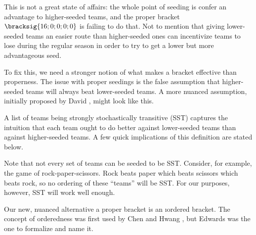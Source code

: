 {    This is not a great state of affairs: the whole point of seeding is confer an advantage to higher-seeded teams, and the proper bracket $\bracksig{16; 0; 0; 0; 0}$ is failing to do that. Not to mention that giving lower-seeded teams an easier route than higher-seeded ones can incentivize teams to lose during the regular season in order to try to get a lower but more advantageous seed.

    To fix this, we need a stronger notion of what makes a bracket effective than properness. The issue with proper seedings is the false assumption that higher-seeded teams will always beat lower-seeded teams. A more nuanced assumption, initially proposed by David \cite{stochastic}, might look like this.


    A list of teams being strongly stochastically transitive (SST) captures the intuition that each team ought to do better against lower-seeded teams than against higher-seeded teams. A few quick implications of this definition are stated below.


    Note that not every set of teams can be seeded to be SST. Consider, for example, the game of rock-paper-scissors. Rock beats paper which beats scissors which beats rock, so no ordering of these ``teams'' will be SST. For our purposes, however, SST will work well enough.

    Our new, nuanced alternative a proper bracket is an \i{ordered bracket}. The concept of orderedness was first used by Chen and Hwang \cite{define_ordered}, but Edwards \cite{montana} was the one to formalize and name it.

}
